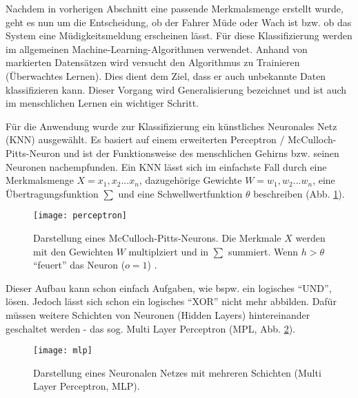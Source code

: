 \label{sec:classification}
Nachdem in vorherigen Abschnitt eine passende Merkmalsmenge erstellt wurde, geht es nun um die Entscheidung, ob der Fahrer Müde oder Wach ist bzw. ob das System eine Müdigkeitsmeldung erscheinen lässt. Für diese Klassifizierung werden im allgemeinen Machine-Learning-Algorithmen verwendet. Anhand von markierten Datensätzen wird versucht den Algorithmus zu Trainieren (Überwachtes Lernen). Dies dient dem Ziel, dass er auch unbekannte Daten klassifizieren kann. Dieser Vorgang wird Generalisierung bezeichnet und ist auch im menschlichen Lernen ein wichtiger Schritt.

Für die Anwendung wurde zur Klassifizierung ein künstliches Neuronales Netz (KNN) ausgewählt. Es basiert auf einem erweiterten Perceptron / McCulloch-Pitts-Neuron \cite{ann} und ist der Funktionsweise des menschlichen Gehirns bzw. seinen Neuronen nachempfunden\cite{marsland_opac-b1129336}. Ein KNN lässt sich im einfachste Fall durch eine Merkmalsmenge $X = x_1, x_2 ... x_n$, dazugehörige Gewichte $W = w_1, w_2 ... w_n$, eine Übertragungsfunktion $\sum$ und eine Schwellwertfunktion $\theta$ beschreiben (Abb. \ref{fig:perceptron}).

\begin{figure}[h] 
  \begin{center}
    \texttt{[image: perceptron]}
    \caption[Schema eines Perceptrons / McCulloch-Pitts-Neurons]{Darstellung eines McCulloch-Pitts-Neurons. Die Merkmale $X$ werden mit den Gewichten $W$ multiplziert und in $\sum$ summiert. Wenn $h > \theta$ "`feuert"' das Neuron ($o = 1$) \cite{marsland_opac-b1129336}. \label{fig:perceptron}}
  \end{center}
\end{figure}

Dieser Aufbau kann schon einfach Aufgaben, wie bspw. ein logisches "`UND"', lösen. Jedoch lässt sich schon ein logisches "`XOR"' nicht mehr abbilden. Dafür müssen weitere Schichten von Neuronen (Hidden Layers) hintereinander geschaltet werden - das sog. Multi Layer Perceptron (MPL, Abb. \ref{fig:mlp}).

\begin{figure}[h] 
  \begin{center}
    \texttt{[image: mlp]}
    \caption[Schema eines Multi-Layer-Perceptrons]{Darstellung eines Neuronalen Netzes mit mehreren Schichten (Multi Layer Perceptron, MLP)\cite{marsland_opac-b1129336}. \label{fig:mlp}}
  \end{center}
\end{figure}

